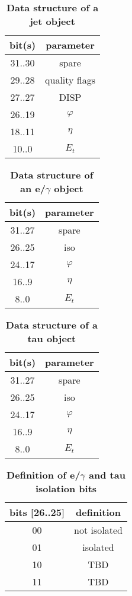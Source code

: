 \documentclass{cmspaper}
\begin{document}
\begin{table}[ht]
\caption{\bf Data structure of a jet object}
\vspace{5mm}
\centering
\begin{tabular}{|c|c|}\hline
bit(s) & parameter \\\hline\hline
31..30 & spare \\
29..28 & quality flags \\
27..27 & DISP \\
26..19 & $\varphi$ \\
18..11 & $\eta$ \\
10..0 & $E_t$ \\\hline
\end{tabular}
\label{table:jet_object}
\end{table}

\begin{table}[ht]
\caption{\bf Data structure of an e/$\gamma$ object}
\vspace{5mm}
\centering
\begin{tabular}{|c|c|}\hline
bit(s) & parameter \\\hline\hline
31..27 & spare \\
26..25 & iso \\
24..17 & $\varphi$ \\
16..9 & $\eta$ \\
8..0 & $E_t$ \\\hline
\end{tabular}
\label{table:egamma_object}
\end{table}

\begin{table}[ht]
\caption{\bf Data structure of a tau object}
\vspace{5mm}
\centering
\begin{tabular}{|c|c|}\hline
bit(s) & parameter \\\hline\hline
31..27 & spare \\
26..25 & iso \\
24..17 & $\varphi$ \\
16..9 & $\eta$ \\
8..0 & $E_t$ \\\hline
\end{tabular}
\label{table:tau_object}
\end{table}

\begin{table}[ht]
\caption{\bf Definition of e/$\gamma$ and tau isolation bits}
\vspace{5mm}
\centering
\begin{tabular}{|c|c|}\hline
bits [26..25] & definition \\\hline\hline
00 & not isolated \\
01 & isolated \\
10 & TBD \\
11 & TBD \\\hline
\end{tabular}
\label{table:eg_tau_iso_bits}
\end{table}
\end{document}
